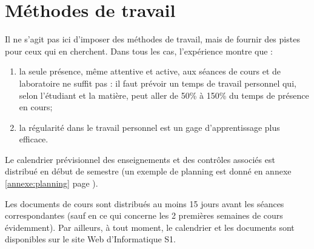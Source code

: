 \section{Méthodes de travail}
Il ne s'agit pas ici d'imposer des méthodes de travail, 
mais de fournir des pistes pour ceux qui en cherchent.
Dans tous les cas, l'expérience montre que :
\begin{enumerate}
\item la seule présence, même attentive et active, aux séances de cours 
	et de laboratoire ne suffit pas : il faut prévoir un temps de travail personnel
	qui, selon l'étudiant et la matière, peut aller de 50\% à 150\% du temps de 
	présence en cours;
\item la régularité dans le travail personnel est un gage d'apprentissage
	plus efficace.
\end{enumerate}
Le calendrier prévisionnel des enseignements et des contrôles associés
est distribué en début de semestre (un exemple de planning est donné
en annexe \ref{annexe:planning} page \pageref{annexe:planning}).

\noindent Les documents de cours sont distribués au moins 15 jours avant
les séances correspondantes (sauf en ce qui concerne les 2 premières semaines
de cours évidemment).
Par ailleurs, à tout moment, le calendrier et les documents sont disponibles 
sur le site {\sc Web} d'Informatique S1.

